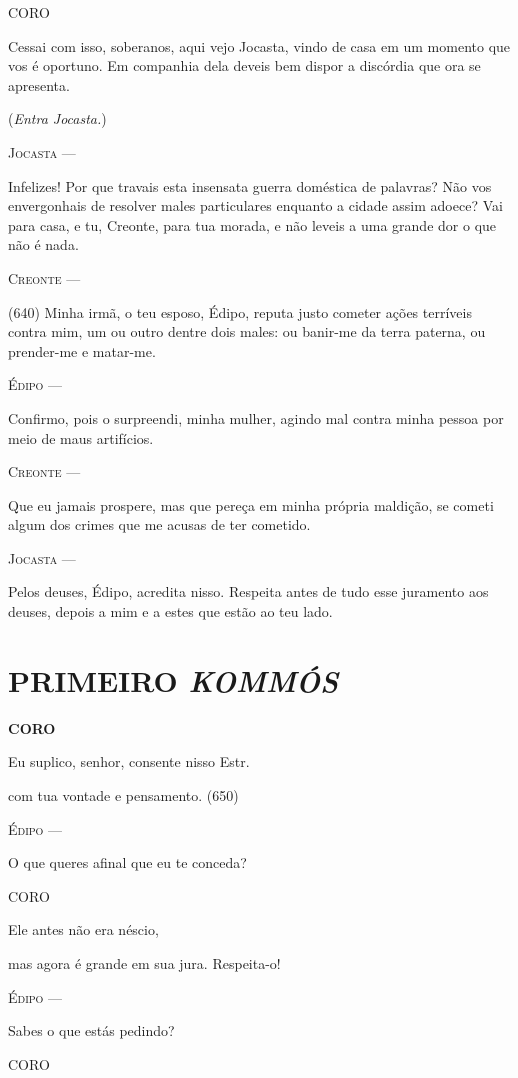 \textsc{CORO}

Cessai com isso, soberanos, aqui vejo Jocasta, vindo de casa em um
momento que vos é oportuno. Em companhia dela deveis bem dispor a
discórdia que ora se apresenta.

(\emph{Entra Jocasta.})

\textsc{Jocasta} ---

Infelizes! Por que travais esta insensata guerra doméstica de palavras?
Não vos envergonhais de resolver males particulares enquanto a cidade
assim adoece? Vai para casa, e tu, Creonte, para tua morada, e não
leveis a uma grande dor o que não é nada.

\textsc{Creonte} ---

(640) Minha irmã, o teu esposo, Édipo, reputa justo cometer ações
terríveis contra mim, um ou outro dentre dois males: ou banir-me da
terra paterna, ou prender-me e matar-me.

\textsc{Édipo} ---

Confirmo, pois o surpreendi, minha mulher, agindo mal contra minha
pessoa por meio de maus artifícios.

\textsc{Creonte} ---

Que eu jamais prospere, mas que pereça em minha própria maldição, se
cometi algum dos crimes que me acusas de ter cometido.

\textsc{Jocasta} ---

Pelos deuses, Édipo, acredita nisso. Respeita antes de tudo esse
juramento aos deuses, depois a mim e a estes que estão ao teu lado.

\section{PRIMEIRO \emph{KOMMÓS}}

\textbf{CORO }

Eu suplico, senhor, consente nisso Estr.

com tua vontade e pensamento. (650)

\textsc{Édipo} ---

O que queres afinal que eu te conceda?

\textsc{CORO}

Ele antes não era néscio,

mas agora é grande em sua jura. Respeita-o!

\textsc{Édipo} ---

Sabes o que estás pedindo?

\textsc{CORO}


